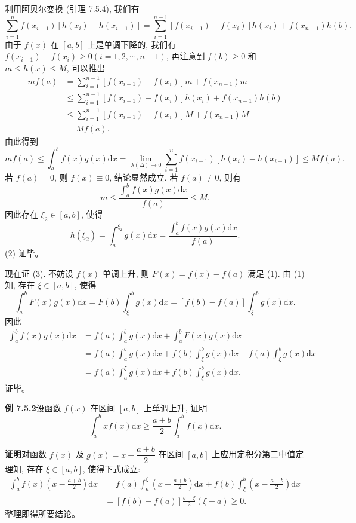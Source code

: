 \documentclass[UTF8, 12pt, fontset=fandol, oneside]{ctexart}
\begin{document}
利用阿贝尔变换 (引理 7.5.4), 我们有
\[
\sum_{i=1}^n f(x_{i-1})[h(x_i)-h(x_{i-1})]
=\sum_{i=1}^{n-1}[f(x_{i-1})-f(x_i)]h(x_i)+f(x_{n-1})h(b).
\]
由于 $f(x)$ 在 $[a,b]$ 上是单调下降的, 我们有 $f(x_{i-1})-f(x_i)\geq0(i=1,2,\cdots,n-1)$, 再注意到 $f(b)\geq0$ 和 $m\leq h(x)\leq M$, 可以推出
\[
\begin{aligned}
  mf(a)&=\sum_{i=1}^{n-1}[f(x_{i-1})-f(x_i)]m+f(x_{n-1})m\\
  &\leq\sum_{i=1}^{n-1}[f(x_{i-1})-f(x_i)]h(x_i)+f(x_{n-1})h(b)\\
  &\leq\sum_{i=1}^{n-1}[f(x_{i-1})-f(x_i)]M+f(x_{n-1})M\\
  &=Mf(a).
\end{aligned}
\]
由此得到
\[
  mf(a)\leq\int_a^b f(x)g(x)\mathrm dx
  =\lim_{\lambda(\Delta)\to0}\sum_{i=1}^n f(x_{i-1})[h(x_i)-h(x_{i-1})]\leq Mf(a).
\]
若 $f(a)=0$, 则 $f(x)\equiv0$, 结论显然成立. 若 $f(a)\neq0$, 则有
\[
  m\leq\frac{\int_a^b f(x)g(x)\mathrm dx}{f(a)}\leq M.
\]
因此存在 $\xi_2\in[a,b]$, 使得
\[
  h(\xi_2)=\int_a^{\xi_2}g(x)\mathrm dx
  =\frac{\int_a^b f(x)g(x)\mathrm dx}{f(a)}.
\]
(2) 证毕。

现在证 (3). 不妨设 $f(x)$ 单调上升, 则 $F(x)=f(x)-f(a)$ 满足 (1). 由 (1) 知, 存在 $\xi\in[a,b]$, 使得
\[
  \int_a^b F(x)g(x)\mathrm dx=F(b)\int_\xi^b g(x)\mathrm dx=[f(b)-f(a)]\int_\xi^b g(x)\mathrm dx.
\]
因此
\[
\begin{aligned}
  \int_a^b f(x)g(x)\mathrm dx
  &=f(a)\int_a^b g(x)\mathrm dx+\int_a^b F(x)g(x)\mathrm dx\\
  &=f(a)\int_a^b g(x)\mathrm dx+f(b)\int_\xi^b g(x)\mathrm dx
  -f(a)\int_\xi^b g(x)\mathrm dx\\
  &=f(a)\int_a^\xi g(x)\mathrm dx+f(b)\int_\xi^b g(x)\mathrm dx.
\end{aligned}
\]
证毕。

\noindent\textbf{例 7.5.2}\quad 设函数 $f(x)$ 在区间 $[a,b]$ 上单调上升, 证明
\[
  \int_a^b xf(x)\mathrm dx\geq\frac{a+b}{2}\int_a^b f(x)\mathrm dx.
\]

\noindent\textbf{证明}\quad 对函数 $f(x)$ 及 $g(x)=x-\dfrac{a+b}{2}$ 在区间 $[a,b]$ 上应用定积分第二中值定理知, 存在 $\xi\in[a,b]$, 使得下式成立:
\[
\begin{aligned}
  \int_a^b f(x)\left(x-\frac{a+b}{2}\right)\mathrm dx
  &=f(a)\int_a^\xi\left(x-\frac{a+b}{2}\right)\mathrm dx
  +f(b)\int_\xi^b\left(x-\frac{a+b}{2}\right)\mathrm dx\\
  &=[f(b)-f(a)]\frac{b-\xi}{2}(\xi-a)\geq0.
\end{aligned}
\]
整理即得所要结论。
\end{document}
